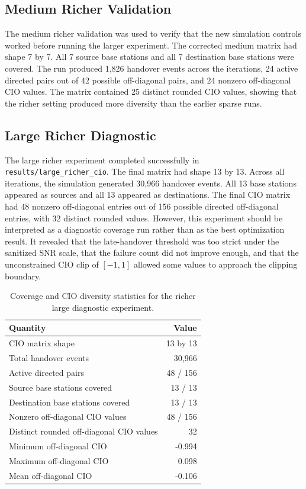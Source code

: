 \documentclass[11pt, a4paper, twoside]{article}
\begin{document}
\subsection{Medium Richer Validation}

The medium richer validation was used to verify that the new simulation controls worked before running the larger experiment. The corrected medium matrix had shape 7 by 7. All 7 source base stations and all 7 destination base stations were covered. The run produced 1,826 handover events across the iterations, 24 active directed pairs out of 42 possible off-diagonal pairs, and 24 nonzero off-diagonal CIO values. The matrix contained 25 distinct rounded CIO values, showing that the richer setting produced more diversity than the earlier sparse runs.

\subsection{Large Richer Diagnostic}

The large richer experiment completed successfully in \texttt{results/large\_richer\_cio}. The final matrix had shape 13 by 13. Across all iterations, the simulation generated 30,966 handover events. All 13 base stations appeared as sources and all 13 appeared as destinations. The final CIO matrix had 48 nonzero off-diagonal entries out of 156 possible directed off-diagonal entries, with 32 distinct rounded values. However, this experiment should be interpreted as a diagnostic coverage run rather than as the best optimization result. It revealed that the late-handover threshold was too strict under the sanitized SNR scale, that the failure count did not improve enough, and that the unconstrained CIO clip of $[-1,1]$ allowed some values to approach the clipping boundary.

\begin{table}[H]
\centering
\begin{tabular}{lr}
\toprule
Quantity & Value \\
\midrule
CIO matrix shape & 13 by 13 \\
Total handover events & 30,966 \\
Active directed pairs & 48 / 156 \\
Source base stations covered & 13 / 13 \\
Destination base stations covered & 13 / 13 \\
Nonzero off-diagonal CIO values & 48 / 156 \\
Distinct rounded off-diagonal CIO values & 32 \\
Minimum off-diagonal CIO & -0.994 \\
Maximum off-diagonal CIO & 0.098 \\
Mean off-diagonal CIO & -0.106 \\
\bottomrule
\end{tabular}
\caption{Coverage and CIO diversity statistics for the richer large diagnostic experiment.}
\label{tab:large_richer_stats}
\end{table}
\end{document}
